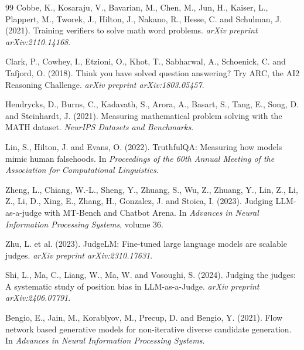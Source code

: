 \documentclass[12pt]{article}
\begin{document}
\begin{thebibliography}{99}
Cobbe, K., Kosaraju, V., Bavarian, M., Chen, M., Jun, H., Kaiser, L., Plappert, M., Tworek, J., Hilton, J., Nakano, R., Hesse, C. and Schulman, J. (2021).
Training verifiers to solve math word problems.
\textit{arXiv preprint arXiv:2110.14168}.

Clark, P., Cowhey, I., Etzioni, O., Khot, T., Sabharwal, A., Schoenick, C. and Tafjord, O. (2018).
Think you have solved question answering? Try ARC, the AI2 Reasoning Challenge.
\textit{arXiv preprint arXiv:1803.05457}.

Hendrycks, D., Burns, C., Kadavath, S., Arora, A., Basart, S., Tang, E., Song, D. and Steinhardt, J. (2021).
Measuring mathematical problem solving with the MATH dataset.
\textit{NeurIPS Datasets and Benchmarks}.

Lin, S., Hilton, J. and Evans, O. (2022).
TruthfulQA: Measuring how models mimic human falsehoods.
In \textit{Proceedings of the 60th Annual Meeting of the Association for Computational Linguistics}.

Zheng, L., Chiang, W.-L., Sheng, Y., Zhuang, S., Wu, Z., Zhuang, Y., Lin, Z., Li, Z., Li, D., Xing, E., Zhang, H., Gonzalez, J. and Stoica, I. (2023).
Judging LLM-as-a-judge with MT-Bench and Chatbot Arena.
In \textit{Advances in Neural Information Processing Systems}, volume 36.

Zhu, L. et al. (2023).
JudgeLM: Fine-tuned large language models are scalable judges.
\textit{arXiv preprint arXiv:2310.17631}.


Shi, L., Ma, C., Liang, W., Ma, W. and Vosoughi, S. (2024).
Judging the judges: A systematic study of position bias in LLM-as-a-Judge.
\textit{arXiv preprint arXiv:2406.07791}.

Bengio, E., Jain, M., Korablyov, M., Precup, D. and Bengio, Y. (2021).
Flow network based generative models for non-iterative diverse candidate generation.
In \textit{Advances in Neural Information Processing Systems}.

\end{thebibliography}
\end{document}
